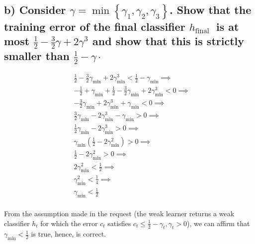 \documentclass[11pt, a4paper]{article}
\begin{document}
\begin{large}
\subsection{b) Consider $\gamma=\min \left\{\gamma_1, \gamma_2, \gamma_3\right\}$. Show that the training error of the final classifier $h_{\text {final }}$ is at most $\frac{1}{2}-\frac{3}{2} \gamma+2 \gamma^3$ and show that this is strictly smaller than $\frac{1}{2}-\gamma \cdot$}
$$
\begin{aligned}
& \frac{1}{2}-\frac{3}{2} \gamma_{\min }+2 \gamma_{\min }^3<\frac{1}{2}-\gamma_{\min } \implies \\
& -\frac{1}{2} + \gamma_{\min } + \frac{1}{2}-\frac{3}{2} \gamma_{\min }+2 \gamma_{\min }^3<0 \implies \\
& -\frac{3}{2}  \gamma_{\min }+2  \gamma_{\min }^3+\gamma_{\min }<0 \implies \\
& \frac{3}{2}  \gamma_{\min }-2  \gamma_{\min }^3-\gamma_{\min }>0 \implies \\
& \frac{1}{2}  \gamma_{\min }-2  \gamma_{\min }^3>0 \implies \\
& \gamma_{\min }\left(\frac{1}{2} -2 \gamma_{\min }^2\right)>0 \implies  \\
& \frac{1}{2} -2 \gamma_{\min }^2>0 \implies  \\
& 2 \gamma_{\min }^2 < \frac{1}{2} \implies  \\
& \gamma_{\min }^2 < \frac{1}{4} \implies  \\
& \gamma_{\min } < \frac{1}{2} \\
\end{aligned}
$$



From the assumption made in the request (the weak learner returns a weak classifier $h_t$ for which the error $c_t$ satisfies $c_t \leq \frac{1}{2}-\gamma_t, \gamma_t>0$), we can affirm that $\gamma_{\min } < \frac{1}{2}$ is true, hence,  is correct.


\end{large}
\end{document}
